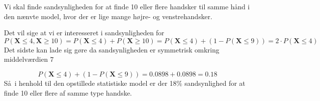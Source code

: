 {
Vi skal finde sandsynligheden for at finde 10 eller flere handsker til samme h\aa nd i den n\ae nvte model, hvor der er lige mange h\o jre- og venstrehandsker.

Det vil sige at vi er interesseret i sandsynligheden for
\[
P(\mathbf{X} \leq 4,\mathbf{X}\geq 10) = P(\mathbf{X} \leq 4) + P(\mathbf{X}\geq 10) = P(\mathbf{X} \leq 4) + (1 - P(\mathbf{X} \leq 9)) = 2 \cdot P(\mathbf{X} \leq 4)
\]
Det sidste kan lade sig g\o re da sandsynligheden er symmetrisk omkring middelv\ae rdien $7$

\[
P(\mathbf{X} \leq 4) + (1 - P(\mathbf{X} \leq 9)) = 0.0898 + 0.0898 = 0.18
\]
S\aa\ i henhold til den opstillede statistiske model er der 18\% sandsynlighed for at finde 10 eller flere af samme type handske.
}
